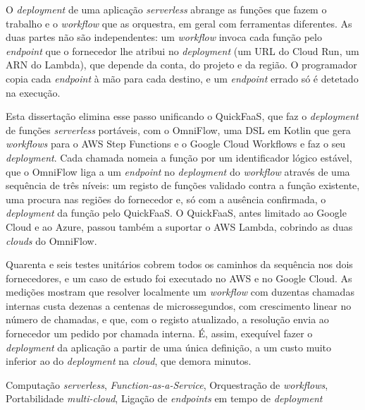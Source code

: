 O \emph{deployment} de uma aplicação \emph{serverless} abrange as funções que fazem o trabalho e o
\emph{workflow} que as orquestra, em geral com ferramentas diferentes. As duas partes não são
independentes: um \emph{workflow} invoca cada função pelo \emph{endpoint} que o fornecedor lhe
atribui no \emph{deployment} (um URL do Cloud Run, um ARN do Lambda), que depende da conta, do
projeto e da região. O programador copia cada \emph{endpoint} à mão para cada destino, e um
\emph{endpoint} errado só é detetado na execução.

Esta dissertação elimina esse passo unificando o QuickFaaS, que faz o \emph{deployment} de funções
\emph{serverless} portáveis, com o OmniFlow, uma DSL em Kotlin que gera \emph{workflows} para o AWS
Step Functions e o Google Cloud Workflows e faz o seu \emph{deployment}. Cada chamada nomeia a função
por um identificador lógico estável, que o OmniFlow liga a um \emph{endpoint} no \emph{deployment}
do \emph{workflow} através de uma sequência de três níveis: um registo de funções validado contra a
função existente, uma procura nas regiões do fornecedor e, só com a ausência confirmada, o
\emph{deployment} da função pelo QuickFaaS. O QuickFaaS, antes limitado ao Google Cloud e ao Azure,
passou também a suportar o AWS Lambda, cobrindo as duas \emph{clouds} do OmniFlow.

Quarenta e seis testes unitários cobrem todos os caminhos da sequência nos dois fornecedores, e um
caso de estudo foi executado no AWS e no Google Cloud. As medições mostram que resolver localmente
um \emph{workflow} com duzentas chamadas internas custa dezenas a centenas de microssegundos, com crescimento
linear no número de chamadas, e que, com o registo atualizado, a resolução envia ao fornecedor um
pedido por chamada interna. É, assim, exequível fazer o \emph{deployment} da aplicação a partir de
uma única definição, a um custo muito inferior ao do \emph{deployment} na \emph{cloud}, que
demora minutos.
\begin{keywords}
Computação \emph{serverless}, \emph{Function-as-a-Service}, Orquestração de \emph{workflows},
Portabilidade \emph{multi-cloud}, Ligação de \emph{endpoints} em tempo de \emph{deployment}
\end{keywords}
